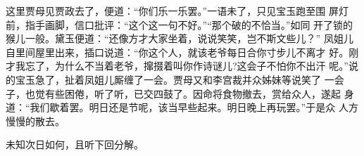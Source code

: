 这里贾母见贾政去了，便道：“你们乐一乐罢。”一语未了，只见宝玉跑至围
屏灯前，指手画脚，信口批评：“这个这一句不好。”“那个破的不恰当。”如同
开了锁的猴儿一般。黛玉便道：“还像方才大家坐着，说说笑笑，岂不斯文些儿？”
凤姐儿自里间屋里出来，插口说道：“你这个人，就该老爷每日合你寸步儿不离才
好。刚才我忘了，为什么不当着老爷，撺掇着叫你作诗谜儿?这会子不怕你不出汗
呢。”说的宝玉急了，扯着凤姐儿厮缠了一会。贾母又和李宫裁并众姊妹等说笑了
一会子，也觉有些困倦，听了听，已交四鼓了。因命将食物撤去，赏给众人，遂起
身道：“我们歇着罢。明日还是节呢，该当早些起来。明日晚上再玩罢。”于是众
人方慢慢的散去。

未知次日如何，且听下回分解。